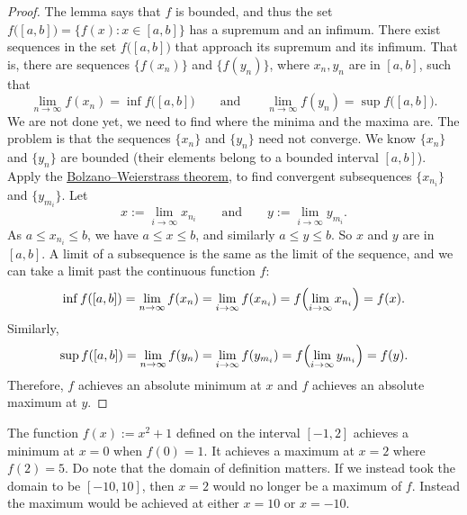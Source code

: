 \begin{proof}
The lemma says that $f$ is bounded, and thus
the set $f\bigl([a,b]\bigr) = \bigl\{ f(x) : x \in [a,b] \bigr\}$ has a supremum and an infimum.
There exist sequences
in the set $f\bigl([a,b]\bigr)$ that approach its supremum and its infimum.
That is, there are sequences
$\bigl\{ f(x_n) \bigr\}$ and $\bigl\{ f(y_n) \bigr\}$, where $x_n, y_n$ are in $[a,b]$,
such that
\begin{equation*}
\lim_{n\to\infty} f(x_n) = \inf f\bigl([a,b]\bigr) \qquad \text{and} \qquad
\lim_{n\to\infty} f(y_n) = \sup f\bigl([a,b]\bigr).
\end{equation*}
We are not done yet, we need to find where the minima and the maxima are.
The problem is that the sequences $\{ x_n \}$ and $\{ y_n \}$ need not
converge.
We know $\{ x_n \}$ and $\{ y_n \}$ are bounded (their elements
belong to 
a bounded interval $[a,b]$).
Apply the 
\hyperref[thm:bwseq]{Bolzano--Weierstrass theorem},
to find
convergent subsequences
$\{ x_{n_i} \}$ and 
$\{ y_{m_i} \}$.  Let
\begin{equation*}
x := \lim_{i\to\infty} x_{n_i}
\qquad \text{and} \qquad
y := \lim_{i\to\infty} y_{m_i}.
\end{equation*}
As $a \leq x_{n_i} \leq b$, we have $a \leq x \leq b$,
and similarly $a \leq y \leq b$.  So $x$ and $y$ are in $[a,b]$.
A limit of a subsequence is the same as the limit of the
sequence, and we can take a limit past the continuous function $f$:
\begin{equation*}
\inf f([a,b]) = \lim_{n\to\infty} f(x_n)
= \lim_{i\to\infty} f(x_{n_i}) = 
f \Bigl( \lim_{i\to\infty} x_{n_i} \Bigr) = f(x) .
\end{equation*}
Similarly,
\begin{equation*}
\sup f([a,b]) = \lim_{n\to\infty} f(y_n)
= \lim_{i\to\infty} f(y_{m_i}) = 
f \Bigl( \lim_{i\to\infty} y_{m_i} \Bigr) = f(y) .
\end{equation*}
Therefore, $f$ achieves an absolute minimum at $x$ and
$f$ achieves an absolute maximum at $y$.
\end{proof}

\begin{example}
The function $f(x) := x^2+1$ defined on the interval $[-1,2]$ achieves a minimum
at $x=0$ when $f(0) = 1$.  It achieves a maximum at $x=2$ where $f(2) = 5$.
Do note that the domain of definition matters.  If we instead took the domain
to be $[-10,10]$, then $x=2$ would no longer be a maximum of $f$.  Instead
the maximum would be achieved at either $x=10$ or $x=-10$.
\end{example}

